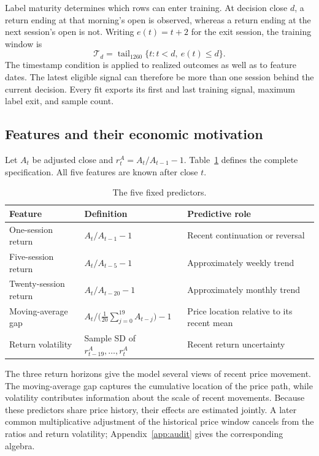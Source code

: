 Label maturity determines which rows can enter training. At decision close $d$, a return ending at that morning's open is observed, whereas a return ending at the next session's open is not. Writing $e(t)=t+2$ for the exit session, the training window is
\begin{equation}
\mathcal T_d=\operatorname{tail}_{1260}\{t:t<d,\ e(t)\leq d\}.
\label{eq:train}
\end{equation}
The timestamp condition is applied to realized outcomes as well as to feature dates. The latest eligible signal can therefore be more than one session behind the current decision. Every fit exports its first and last training signal, maximum label exit, and sample count.

\subsection{Features and their economic motivation}
Let $A_t$ be adjusted close and $r_t^A=A_t/A_{t-1}-1$. Table~\ref{tab:features} defines the complete specification. All five features are known after close $t$.

\begin{table}[!htbp]
\centering\small
\caption{The five fixed predictors.}
\label{tab:features}
\begin{tabularx}{\textwidth}{@{}p{}p{}X@{}}
\toprule
Feature & Definition & Predictive role \\
\midrule
One-session return & $A_t/A_{t-1}-1$ & Recent continuation or reversal \\
Five-session return & $A_t/A_{t-5}-1$ & Approximately weekly trend \\
Twenty-session return & $A_t/A_{t-20}-1$ & Approximately monthly trend \\
Moving-average gap & $A_t/\bigl(\frac1{20}\sum_{j=0}^{19}A_{t-j}\bigr)-1$ & Price location relative to its recent mean \\
Return volatility & Sample SD of $r^A_{t-19},\ldots,r^A_t$ & Recent return uncertainty \\
\bottomrule
\end{tabularx}
\end{table}

The three return horizons give the model several views of recent price movement. The moving-average gap captures the cumulative location of the price path, while volatility contributes information about the scale of recent movements. Because these predictors share price history, their effects are estimated jointly. A later common multiplicative adjustment of the historical price window cancels from the ratios and return volatility; Appendix~\ref{app:audit} gives the corresponding algebra.

